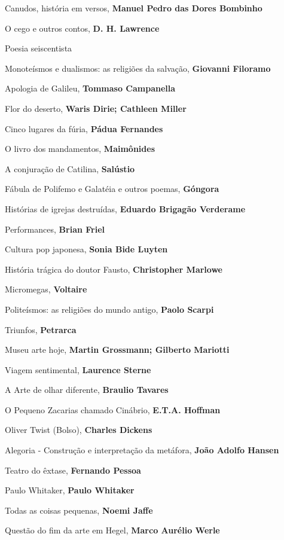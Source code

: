 \begin{multicols}{2}
\begin{enumerate}
{\item Canudos, história em versos, \textbf{Manuel Pedro das Dores Bombinho}
\item O cego e outros contos, \textbf{D. H. Lawrence}
\item Poesia seiscentista
\item Monoteísmos e dualismos: as religiões da salvação, \textbf{Giovanni Filoramo}
\item Apologia de Galileu, \textbf{Tommaso Campanella}
\item Flor do deserto, \textbf{Waris Dirie; Cathleen Miller}
\item Cinco lugares da fúria, \textbf{Pádua Fernandes}
\item O livro dos mandamentos, \textbf{Maimônides}
\item A conjuração de Catilina, \textbf{Salústio}
\item Fábula de Polifemo e Galatéia e outros poemas, \textbf{Góngora}
\item Histórias de igrejas destruídas, \textbf{Eduardo Brigagão Verderame}
\item Performances, \textbf{Brian Friel}
\item Cultura pop japonesa, \textbf{Sonia Bide Luyten}
\item História trágica do doutor Fausto, \textbf{Christopher Marlowe}
\item Micromegas, \textbf{Voltaire}
\item Politeísmos: as religiões do mundo antigo, \textbf{Paolo Scarpi}
\item Triunfos, \textbf{Petrarca}
\item Museu arte hoje, \textbf{Martin Grossmann; Gilberto Mariotti}
\item Viagem sentimental, \textbf{Laurence Sterne}
\item A Arte de olhar diferente, \textbf{Braulio Tavares}
\item O Pequeno Zacarias chamado Cinábrio, \textbf{E.T.A. Hoffman}
\item Oliver Twist (Bolso), \textbf{Charles Dickens}
\item Alegoria - Construção e interpretação da metáfora, \textbf{João Adolfo Hansen}
\item Teatro do êxtase, \textbf{Fernando Pessoa}
\item Paulo Whitaker, \textbf{Paulo Whitaker}
\item Todas as coisas pequenas, \textbf{Noemi Jaffe}
\item Questão do fim da arte em Hegel, \textbf{Marco Aurélio Werle}
}
\end{enumerate}
\end{multicols}
